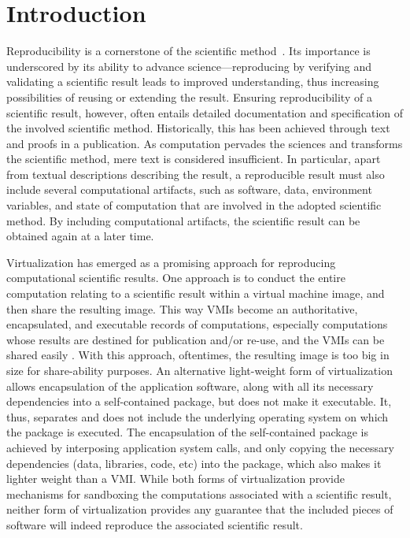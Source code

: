 \section{Introduction}

Reproducibility is a cornerstone of the scientific method~\cite{borgman2012data}. 
Its importance is underscored by its ability to advance science---reproducing by verifying and validating a scientific result leads to improved understanding, thus increasing possibilities of reusing or extending the result. 
Ensuring reproducibility of a scientific result, however, often entails detailed documentation and specification of the involved scientific method. Historically, this has been achieved through text and proofs in a publication. 
As computation pervades the sciences and transforms the scientific method, mere text is considered insufficient. 
In particular, apart from textual descriptions describing the result, a reproducible result must also include several computational artifacts, such as software, data,  environment variables, and state of computation that are involved in the adopted scientific method.  By including computational artifacts, the scientific result can be obtained again at a later time. 

Virtualization has emerged as a promising approach for reproducing computational scientific results. One approach is to conduct the entire computation relating to a scientific result within a virtual machine image, and then share the resulting image. This way VMIs become an authoritative, encapsulated, and executable records of computations, especially computations whose results are destined for publication and/or re-use, and the VMIs can be shared easily \cite{}. 
With this approach, oftentimes, the resulting image is too big in size for share-ability purposes. An alternative light-weight form of virtualization allows encapsulation of the application software, along with all its necessary dependencies into a self-contained package, but does not make it executable.  It, thus, separates and does not include the underlying operating system on which the package is executed. The encapsulation of the self-contained package is achieved by interposing application system calls, and only copying the necessary dependencies (data, libraries, code, etc) into the package, which also makes it lighter weight than a VMI. While both forms of virtualization provide mechanisms for sandboxing the computations associated with a scientific result, neither form of virtualization provides any guarantee that the included pieces of software will indeed reproduce the associated scientific result. 

